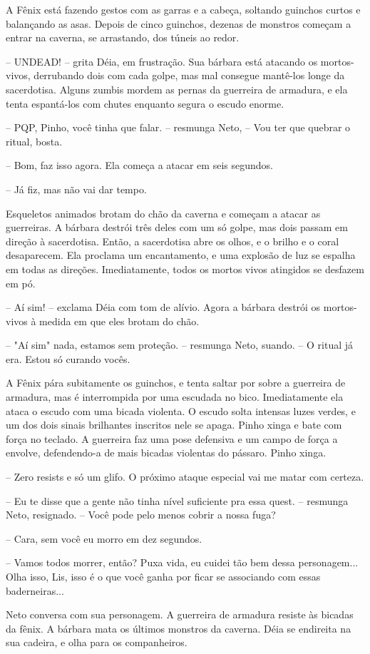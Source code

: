 A Fênix está fazendo gestos com as garras e a cabeça, soltando guinchos curtos e balançando as asas.
Depois de cinco guinchos, dezenas de monstros começam a entrar na caverna, se arrastando, dos túneis ao redor.

-- UNDEAD! -- grita Déia, em frustração. Sua bárbara está atacando os mortos-vivos, derrubando dois com cada golpe, 
mas mal consegue mantê-los longe da sacerdotisa. 
Alguns zumbis mordem as pernas da guerreira de armadura, e ela tenta espantá-los com chutes enquanto segura o escudo enorme.

-- PQP, Pinho, você tinha que falar. -- resmunga Neto, -- Vou ter que quebrar o ritual, bosta.

-- Bom, faz isso agora. Ela começa a atacar em seis segundos.

-- Já fiz, mas não vai dar tempo.

Esqueletos animados brotam do chão da caverna e começam a atacar as guerreiras. A bárbara destrói três deles com um só golpe,
mas dois passam em direção à sacerdotisa. 
Então, a sacerdotisa abre os olhos, e o brilho e o coral
desaparecem. Ela proclama um encantamento, e uma explosão de luz se espalha em todas as direções. Imediatamente,
todos os mortos vivos atingidos se desfazem em pó.

-- Aí sim! -- exclama Déia com tom de alívio. Agora a bárbara destrói os mortos-vivos à medida em que eles brotam do chão.

-- "Aí sim" nada, estamos sem proteção. -- resmunga Neto, suando. -- O ritual já era. Estou só curando vocês.

A Fênix pára subitamente os guinchos, e tenta saltar por sobre a guerreira de armadura, mas é interrompida por uma escudada no bico.
Imediatamente ela ataca o escudo com uma bicada violenta. O escudo solta intensas luzes verdes, e um dos dois sinais
brilhantes inscritos nele se apaga. Pinho xinga e bate com força no teclado. A guerreira faz uma pose defensiva e um campo de força a envolve,
defendendo-a de mais bicadas violentas do pássaro. Pinho xinga.

-- Zero resists e só um glifo. O próximo ataque especial vai me matar com certeza.

-- Eu te disse que a gente não tinha nível suficiente pra essa quest. -- resmunga Neto, resignado. -- Você pode pelo menos cobrir a nossa fuga?

-- Cara, sem você eu morro em dez segundos.

-- Vamos todos morrer, então? Puxa vida, eu cuidei tão bem dessa personagem... Olha isso, Lis, isso é o que você ganha por ficar se associando
com essas baderneiras...

Neto conversa com sua personagem. A guerreira de armadura resiste às bicadas da fênix. A bárbara mata os últimos monstros da caverna.
Déia se endireita na sua cadeira, e olha para os companheiros.
